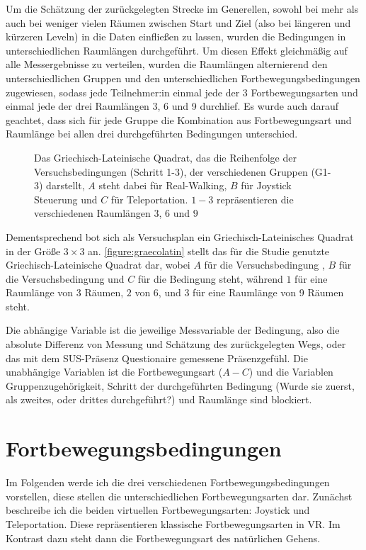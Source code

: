     Um die Schätzung der zurückgelegten Strecke im Generellen, sowohl bei mehr als auch bei weniger vielen Räumen zwischen Start und Ziel (also bei längeren und kürzeren Leveln) in die Daten einfließen zu lassen, wurden die Bedingungen in unterschiedlichen Raumlängen durchgeführt. Um diesen Effekt gleichmäßig auf alle Messergebnisse zu verteilen, wurden die Raumlängen alternierend den unterschiedlichen Gruppen und den unterschiedlichen Fortbewegungsbedingungen zugewiesen, sodass jede Teilnehmer:in einmal jede der 3 Fortbewegungsarten und einmal jede der drei Raumlängen 3, 6 und 9 durchlief. Es wurde auch darauf geachtet, dass sich für jede Gruppe die Kombination aus Fortbewegungsart und Raumlänge bei allen drei durchgeführten Bedingungen unterschied.

    \begin{figure}[!h]
        \centering
        

        \caption{Das Griechisch-Lateinische Quadrat, das die Reihenfolge der Versuchsbedingungen (Schritt 1-3), der verschiedenen Gruppen (G1-3) darstellt, $A$ steht dabei für Real-Walking, $B$ für Joystick Steuerung und $C$ für Teleportation. $1-3$ repräsentieren die verschiedenen Raumlängen $3$, $6$ und $9$}\label{figure:graecolatin}
    \end{figure}

    Dementsprechend bot sich als Versuchsplan ein Griechisch-Lateinisches Quadrat in der Größe $3 \times 3$ an. \autoref{figure:graecolatin} stellt das für die Studie genutzte Griechisch-Lateinische Quadrat dar, wobei $A$ für die Versuchsbedingung , $B$ für die Versuchsbedingung  und $C$ für die Bedingung  steht, während $1$ für eine Raumlänge von 3 Räumen, $2$ von 6, und $3$ für eine Raumlänge von 9 Räumen steht.

    Die abhängige Variable ist die jeweilige Messvariable der Bedingung, also die absolute Differenz von Messung und Schätzung des zurückgelegten Wegs, oder das mit dem SUS-Präsenz Questionaire gemessene Präsenzgefühl. Die unabhängige Variablen ist die Fortbewegungsart ($A-C$) und die Variablen Gruppenzugehörigkeit, Schritt der durchgeführten Bedingung (Wurde sie zuerst, als zweites, oder drittes durchgeführt?) und Raumlänge sind blockiert. %

    \section{Fortbewegungsbedingungen}\label{sec:conditions}
        Im Folgenden werde ich die drei verschiedenen Fortbewegungsbedingungen vorstellen, diese stellen die unterschiedlichen Fortbewegungsarten dar. Zunächst beschreibe ich die beiden virtuellen Fortbewegungsarten: Joystick und Teleportation. Diese repräsentieren klassische Fortbewegungsarten in VR. Im Kontrast dazu steht dann die Fortbewegungsart des natürlichen Gehens.

